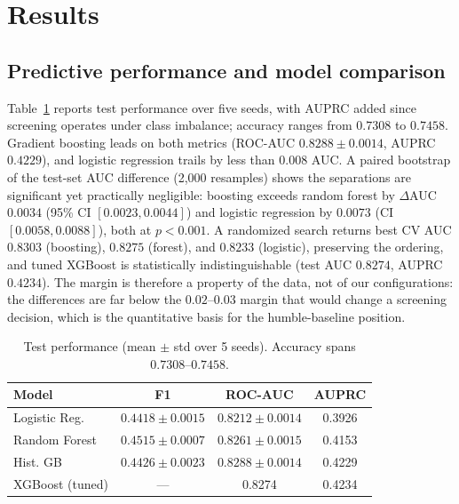 \documentclass[conference]{IEEEtran}
\begin{document}
\section{Results}

\subsection{Predictive performance and model comparison}
Table~\ref{tab:perf} reports test performance over five seeds, with AUPRC added since screening operates under class imbalance; accuracy ranges from $0.7308$ to $0.7458$. Gradient boosting leads on both metrics (ROC-AUC $0.8288 \pm 0.0014$, AUPRC $0.4229$), and logistic regression trails by less than $0.008$ AUC. A paired bootstrap of the test-set AUC difference (2{,}000 resamples) shows the separations are significant yet practically negligible: boosting exceeds random forest by $\Delta$AUC $0.0034$ (95\% CI $[0.0023, 0.0044]$) and logistic regression by $0.0073$ (CI $[0.0058, 0.0088]$), both at $p<0.001$. A randomized search returns best CV AUC $0.8303$ (boosting), $0.8275$ (forest), and $0.8233$ (logistic), preserving the ordering, and tuned XGBoost is statistically indistinguishable (test AUC $0.8274$, AUPRC $0.4234$). The margin is therefore a property of the data, not of our configurations: the differences are far below the $0.02$--$0.03$ margin that would change a screening decision, which is the quantitative basis for the humble-baseline position.

\begin{table}[!t]
\caption{Test performance (mean $\pm$ std over 5 seeds). Accuracy spans $0.7308$--$0.7458$.}
\label{tab:perf}
\centering
\footnotesize
\begin{tabular}{lccc}
\toprule
Model & F1 & ROC-AUC & AUPRC \\
\midrule
Logistic Reg. & $0.4418 \pm 0.0015$ & $0.8212 \pm 0.0014$ & 0.3926 \\
Random Forest & $0.4515 \pm 0.0007$ & $0.8261 \pm 0.0015$ & 0.4153 \\
Hist. GB & $0.4426 \pm 0.0023$ & $0.8288 \pm 0.0014$ & 0.4229 \\
XGBoost (tuned) & --- & 0.8274 & 0.4234 \\
\bottomrule
\end{tabular}
\end{table}
\end{document}
